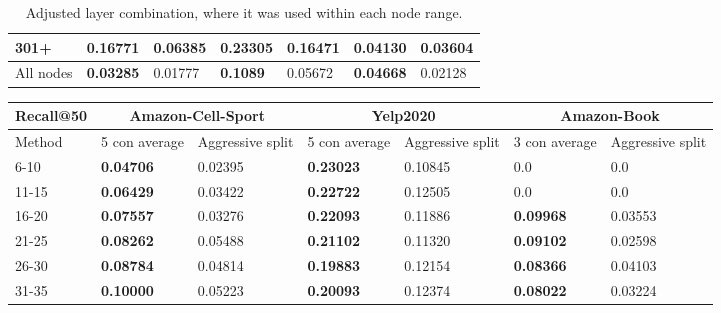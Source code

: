 \begin{table*}[h!]
\begin{tabular}{|l|l|l||l|l||l|l|}
        301+      & \textbf{0.16771}                        & 0.06385                        & \textbf{0.23305}                 & 0.16471          & \textbf{0.04130} & 0.03604          \\ \hline
        All nodes & \textbf{0.03285}                        & 0.01777                        & \textbf{0.1089 }                 & 0.05672          & \textbf{0.04668} & 0.02128          \\ \hline
    \end{tabular}
    \caption{Adjusted layer combination, where it was used within each node range.}
    \label{tab:ndcg-adjusted-layer-bad-performance}
\end{table*}

\begin{table*}[h!]
    \centering
    \begin{tabular}{|l|l|l||l|l||l|l|}
        \hline
        Recall@50 & \multicolumn{2}{c||}{Amazon-Cell-Sport} & \multicolumn{2}{c||}{Yelp2020} & \multicolumn{2}{c|}{Amazon-Book}                                                          \\ \hline
        Method    & 5 con average                           & Aggressive split               & 5 con average                    & Aggressive split & 3 con average    & Aggressive split \\ \hline
        6-10      & \textbf{0.04706}                        & 0.02395                        & \textbf{0.23023}                 & 0.10845          & 0.0              & 0.0              \\ \hline
        11-15     & \textbf{0.06429}                        & 0.03422                        & \textbf{0.22722}                 & 0.12505          & 0.0              & 0.0              \\ \hline
        16-20     & \textbf{0.07557}                        & 0.03276                        & \textbf{0.22093}                 & 0.11886          & \textbf{0.09968} & 0.03553          \\ \hline
        21-25     & \textbf{0.08262}                        & 0.05488                        & \textbf{0.21102}                 & 0.11320          & \textbf{0.09102} & 0.02598          \\ \hline
        26-30     & \textbf{0.08784}                        & 0.04814                        & \textbf{0.19883}                 & 0.12154          & \textbf{0.08366} & 0.04103          \\ \hline
        31-35     & \textbf{0.10000}                        & 0.05223                        & \textbf{0.20093}                 & 0.12374          & \textbf{0.08022} & 0.03224          \\ \hline

\end{tabular}
\end{table*}
